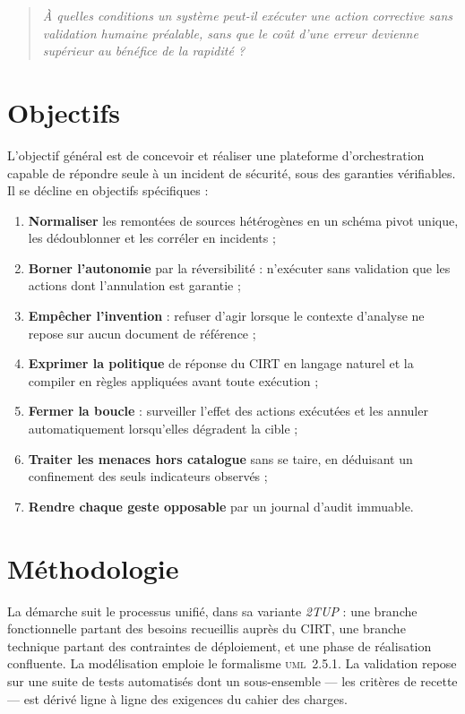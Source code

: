\begin{quote}
\textit{\`A quelles conditions un syst\`eme peut-il ex\'ecuter une action corrective
sans validation humaine pr\'ealable, sans que le co\^ut d'une erreur devienne
sup\'erieur au b\'en\'efice de la rapidit\'e ?}
\end{quote}

\section*{Objectifs}
L'objectif g\'en\'eral est de concevoir et r\'ealiser une plateforme d'orchestration
capable de r\'epondre seule \`a un incident de s\'ecurit\'e, sous des garanties
v\'erifiables. Il se d\'ecline en objectifs sp\'ecifiques :

\begin{enumerate}
  \item \textbf{Normaliser} les remont\'ees de sources h\'et\'erog\`enes en un sch\'ema
        pivot unique, les d\'edoublonner et les corr\'eler en incidents ;
  \item \textbf{Borner l'autonomie} par la r\'eversibilit\'e : n'ex\'ecuter sans
        validation que les actions dont l'annulation est garantie ;
  \item \textbf{Emp\^echer l'invention} : refuser d'agir lorsque le contexte
        d'analyse ne repose sur aucun document de r\'ef\'erence ;
  \item \textbf{Exprimer la politique} de r\'eponse du CIRT en langage naturel et la
        compiler en r\`egles appliqu\'ees avant toute ex\'ecution ;
  \item \textbf{Fermer la boucle} : surveiller l'effet des actions ex\'ecut\'ees et les
        annuler automatiquement lorsqu'elles d\'egradent la cible ;
  \item \textbf{Traiter les menaces hors catalogue} sans se taire, en d\'eduisant un
        confinement des seuls indicateurs observ\'es ;
  \item \textbf{Rendre chaque geste opposable} par un journal d'audit immuable.
\end{enumerate}

\section*{M\'ethodologie}
La d\'emarche suit le processus unifi\'e, dans sa variante \emph{2TUP} : une branche
fonctionnelle partant des besoins recueillis aupr\`es du CIRT, une branche technique
partant des contraintes de d\'eploiement, et une phase de r\'ealisation confluente.
La mod\'elisation emploie le formalisme \textsc{uml}~2.5.1. La validation repose sur une
suite de tests automatis\'es dont un sous-ensemble --- les crit\`eres de recette ---
est d\'eriv\'e ligne \`a ligne des exigences du cahier des charges.

